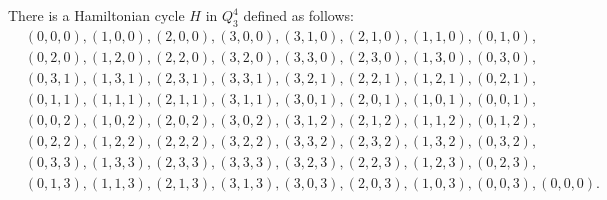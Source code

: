   There is a Hamiltonian cycle $H$ in $Q_3^4$ defined as follows:
  \begin{align*}
    &(0, 0, 0), (1, 0, 0), (2, 0, 0), (3, 0, 0), (3, 1, 0), (2, 1, 0), (1, 1, 0), (0, 1, 0), \\
    &(0, 2, 0), (1, 2, 0), (2, 2, 0), (3, 2, 0), (3, 3, 0), (2, 3, 0), (1, 3, 0), (0, 3, 0), \\
    &(0, 3, 1), (1, 3, 1), (2, 3, 1), (3, 3, 1), (3, 2, 1), (2, 2, 1), (1, 2, 1), (0, 2, 1), \\
    &(0, 1, 1), (1, 1, 1), (2, 1, 1), (3, 1, 1), (3, 0, 1), (2, 0, 1), (1, 0, 1), (0, 0, 1), \\
    &(0, 0, 2), (1, 0, 2), (2, 0, 2), (3, 0, 2), (3, 1, 2), (2, 1, 2), (1, 1, 2), (0, 1, 2), \\
    &(0, 2, 2), (1, 2, 2), (2, 2, 2), (3, 2, 2), (3, 3, 2), (2, 3, 2), (1, 3, 2), (0, 3, 2), \\
    &(0, 3, 3), (1, 3, 3), (2, 3, 3), (3, 3, 3), (3, 2, 3), (2, 2, 3), (1, 2, 3), (0, 2, 3), \\
    &(0, 1, 3), (1, 1, 3), (2, 1, 3), (3, 1, 3), (3, 0, 3), (2, 0, 3), (1, 0, 3), (0, 0, 3), (0, 0, 0).
  \end{align*}
